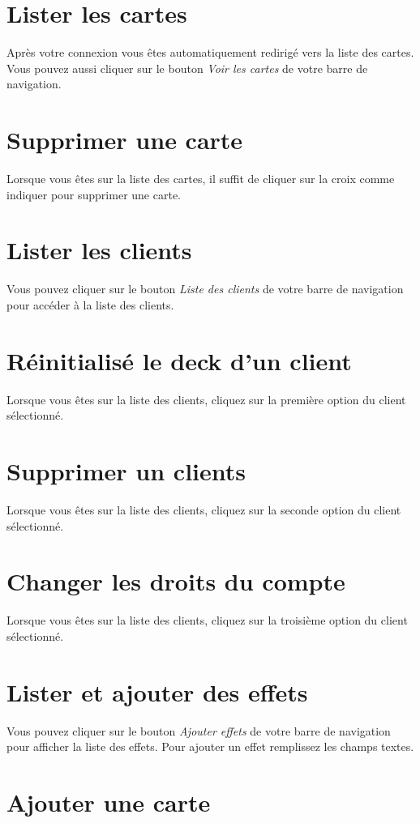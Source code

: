 \documentclass[a4paper,11pt]{report}
\begin{document}
	\section{Lister les cartes}
	Après votre connexion vous êtes automatiquement redirigé vers la liste des cartes. Vous pouvez aussi cliquer sur le bouton \textit{Voir les cartes} de votre barre de navigation.

	\section{Supprimer une carte}
	Lorsque vous êtes sur la liste des cartes, il suffit de cliquer sur la croix comme indiquer pour supprimer une carte.


	\section{Lister les clients}
	Vous pouvez cliquer sur le bouton \textit{Liste des clients} de votre barre de navigation pour accéder à la liste des clients.

	\section{Réinitialisé le deck d'un client}
	Lorsque vous êtes sur la liste des clients, cliquez sur la première option du client sélectionné.

	\section{Supprimer un clients}
	Lorsque vous êtes sur la liste des clients, cliquez sur la seconde option du client sélectionné.

	\section{Changer les droits du compte}
	Lorsque vous êtes sur la liste des clients, cliquez sur la troisième option du client sélectionné.

	\section{Lister et ajouter des effets}
	Vous pouvez cliquer sur le bouton \textit{Ajouter effets} de votre barre de navigation pour afficher la liste des effets. Pour ajouter un effet remplissez les champs textes.

	\section{Ajouter une carte}
\end{document}
